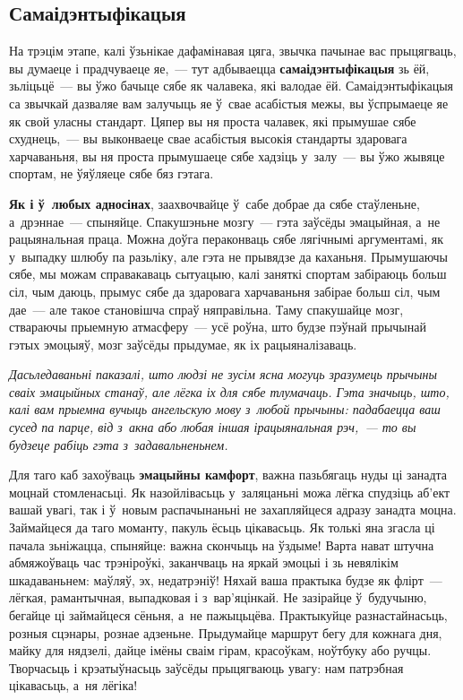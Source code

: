\subsection*{Самаідэнтыфікацыя}

На трэцім этапе, калі ўзьнікае дафамінавая цяга, звычка пачынае вас прыцягваць, вы думаеце і прадчуваеце яе,~--- тут адбываецца \textbf{самаідэнтыфікацыя} зь ёй, зьліцьцё~--- вы ўжо бачыце сябе як чалавека, які валодае ёй. Самаідэнтыфікацыя са звычкай дазваляе вам залучыць яе ў~свае асабістыя межы, вы ўспрымаеце яе як свой уласны стандарт. Цяпер вы ня проста чалавек, які прымушае сябе схуднець,~--- вы выконваеце свае асабістыя высокія стандарты здаровага харчаваньня, вы ня проста прымушаеце сябе хадзіць у~залу~--- вы ўжо жывяце спортам, не ўяўляеце сябе бяз гэтага.

\textbf{Як і ў~любых адносінах}, заахвочвайце ў~сабе добрае да сябе стаўленьне, а~дрэннае~--- спыняйце. Спакушэньне мозгу~--- гэта заўсёды эмацыйная, а~не рацыянальная праца. Можна доўга пераконваць сябе лягічнымі аргументамі, як у~выпадку шлюбу па разьліку, але гэта не прывядзе да каханьня. Прымушаючы сябе, мы можам справакаваць сытуацыю, калі заняткі спортам забіраюць больш сіл, чым даюць, прымус сябе да здаровага харчаваньня забірае больш сіл, чым дае~--- але такое становішча спраў няправільна. Таму спакушайце мозг, ствараючы прыемную атмасферу~--- усё роўна, што будзе пэўнай прычынай гэтых эмоцыяў, мозг заўсёды прыдумае, як іх рацыяналізаваць.

\emph{Дасьледаваньні паказалі, што людзі не зусім ясна могуць зразумець прычыны сваіх эмацыйных станаў, але лёгка іх для сябе тлумачаць. Гэта значыць, што, калі вам прыемна вучыць ангельскую мову з~любой прычыны: падабаецца ваш сусед па парце, від з~акна або любая іншая ірацыянальная рэч,~--- то вы будзеце рабіць гэта з~задавальненьнем.}

Для таго каб захоўваць \textbf{эмацыйны камфорт}, важна пазьбягаць нуды ці занадта моцнай стомленасьці. Як назойлівасьць у~заляцаньні можа лёгка спудзіць аб'ект вашай увагі, так і ў~новым распачынаньні не захапляйцеся адразу занадта моцна. Займайцеся да таго моманту, пакуль ёсьць цікавасьць. Як толькі яна згасла ці пачала зьніжацца, спыняйце: важна скончыць на ўздыме! Варта нават штучна абмяжоўваць час трэніроўкі, заканчваць на яркай эмоцыі і зь невялікім шкадаваньнем: маўляў, эх, недатрэніў! Няхай ваша практыка будзе як флірт~--- лёгкая, рамантычная, выпадковая і з~вар'яцінкай. Не зазірайце ў~будучыню, бегайце ці займайцеся сёньня, а~не пажыцьцёва. Практыкуйце разнастайнасьць, розныя сцэнары, рознае адзеньне. Прыдумайце маршрут бегу для кожнага дня, майку для нядзелі, дайце імёны сваім гірам, красоўкам, ноўтбуку або ручцы. Творчасьць і крэатыўнасьць заўсёды прыцягваюць увагу: нам патрэбная цікавасьць, а~ня лёгіка!

